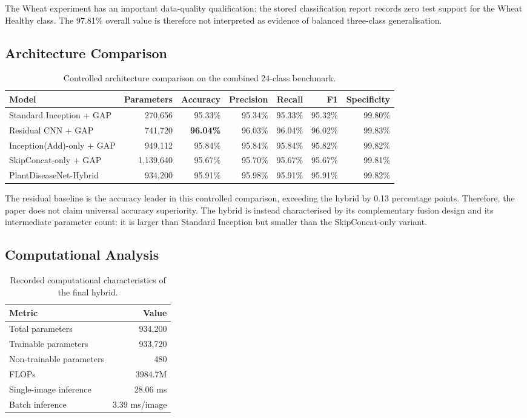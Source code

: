 \documentclass[a4paper,fleqn]{cas-dc}
\begin{document}
The Wheat experiment has an important data-quality qualification: the stored classification report records zero test support for the Wheat Healthy class. The 97.81\% overall value is therefore not interpreted as evidence of balanced three-class generalisation.

\subsection{Architecture Comparison}
\begin{table}[!t]
\centering
\caption{Controlled architecture comparison on the combined 24-class benchmark.}
\label{tab:ablation}
\begin{tabular}{lrrrrrr}
\toprule
Model & Parameters & Accuracy & Precision & Recall & F1 & Specificity \\
\midrule
Standard Inception + GAP & 270,656 & 95.33\% & 95.34\% & 95.33\% & 95.32\% & 99.80\% \\
Residual CNN + GAP & 741,720 & \textbf{96.04\%} & 96.03\% & 96.04\% & 96.02\% & 99.83\% \\
Inception(Add)-only + GAP & 949,112 & 95.84\% & 95.84\% & 95.84\% & 95.82\% & 99.82\% \\
SkipConcat-only + GAP & 1,139,640 & 95.67\% & 95.70\% & 95.67\% & 95.67\% & 99.81\% \\
PlantDiseaseNet-Hybrid & 934,200 & 95.91\% & 95.98\% & 95.91\% & 95.91\% & 99.82\% \\
\bottomrule
\end{tabular}
\end{table}

The residual baseline is the accuracy leader in this controlled comparison, exceeding the hybrid by 0.13 percentage points. Therefore, the paper does not claim universal accuracy superiority. The hybrid is instead characterised by its complementary fusion design and its intermediate parameter count: it is larger than Standard Inception but smaller than the SkipConcat-only variant.

\subsection{Computational Analysis}
\begin{table}[!t]
\centering
\caption{Recorded computational characteristics of the final hybrid.}
\label{tab:complexity}
\begin{tabular}{lr}
\toprule
Metric & Value \\
\midrule
Total parameters & 934,200 \\
Trainable parameters & 933,720 \\
Non-trainable parameters & 480 \\
FLOPs & 3984.7M \\
Single-image inference & 28.06 ms \\
Batch inference & 3.39 ms/image \\
\bottomrule
\end{tabular}
\end{table}
\end{document}
